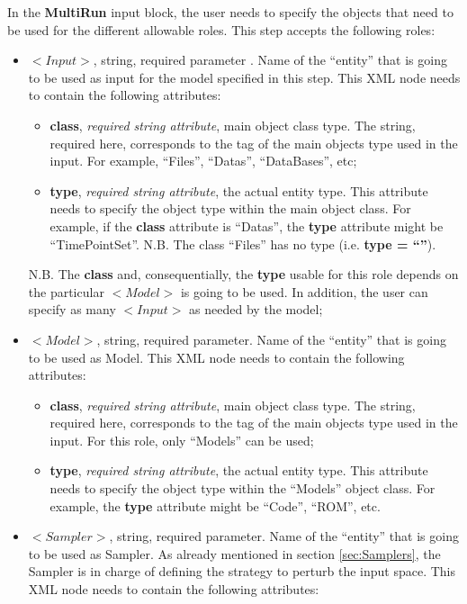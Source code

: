 \vspace{-5mm}
In the \textbf{MultiRun} input block, the user needs to specify the objects that need to be used for the different allowable roles. This step accepts the following roles:
\begin{itemize}
\item $<Input>$, string, required parameter . Name of the ``entity'' that is going to be used as input for the model specified in this step. This XML node needs to contain the following attributes:
\begin{itemize}
  \item \textbf{class}, \textit{required string attribute}, main object class type. The string, required here, corresponds to the tag of the main objects type used in the input. For example, ``Files'', ``Datas'', ``DataBases'', etc;
  \item \textbf{type}, \textit{required string attribute}, the actual entity type. This attribute needs to specify the object type within the main object class. For example, if the  \textbf{class} attribute is ``Datas'', the \textbf{type} attribute might be ``TimePointSet''. N.B. The class ``Files'' has no type (i.e. \textbf{type = ``''}).
\end{itemize}
N.B. The \textbf{class} and, consequentially,  the \textbf{type} usable for this role depends on the particular $<Model>$ is going to be used. In addition, the user can specify as many $<Input>$ as needed by the model;
\item $<Model>$, string, required parameter. Name of the ``entity'' that is going to be used as Model. This XML node needs to contain the following attributes:
\begin{itemize}
  \item \textbf{class}, \textit{required string attribute}, main object class type. The string, required here, corresponds to the tag of the main objects type used in the input. For this role, only ``Models'' can be used;
  \item \textbf{type}, \textit{required string attribute}, the actual entity type. This attribute needs to specify the object type within the ``Models'' object class. For example, the \textbf{type} attribute might be ``Code'', ``ROM'', etc.
\end{itemize}
\item $<Sampler>$, string, required parameter. Name of the ``entity'' that is going to be used as Sampler. As already mentioned in section \ref{sec:Samplers}, the Sampler is in charge of defining the strategy to perturb the input space. This XML node needs to contain the following attributes:

\end{itemize}
